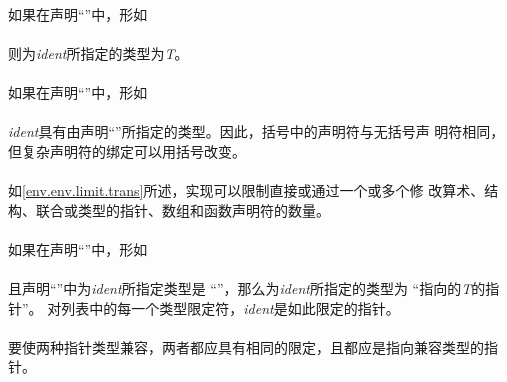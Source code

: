 \paragraph{}
如果在声明``''中，形如                                        \\
\mbox{\hspace{4em}}                                            \\
则为\textit{ident}所指定的类型为\textit{T}。

\paragraph{}
如果在声明``''中，形如                                        \\
\mbox{\hspace{4em}\tm{(}  \tm{)}}                              \\
\textit{ident}具有由声明``''所指定的类型。因此，括号中的声明符与无括号声
明符相同，但复杂声明符的绑定可以用括号改变。

\implimit
\paragraph{}
如\ref{env.env.limit.trans}所述，实现可以限制直接或通过一个或多个修
改算术、结构、联合或类型的指针、数组和函数声明符的数量。


\semantic
\paragraph{}
如果在声明``''中，形如                                        \\
\mbox{\hspace{4em}\tm{*}  }           \\
且声明``''中为\textit{ident}所指定类型是
``''，那么为\textit{ident}所指定的类型为
``指向的\textit{T}的指针''。
对列表中的每一个类型限定符，\textit{ident}是如此限定的指针。

\paragraph{}
要使两种指针类型兼容，两者都应具有相同的限定，且都应是指向兼容类型的指针。


